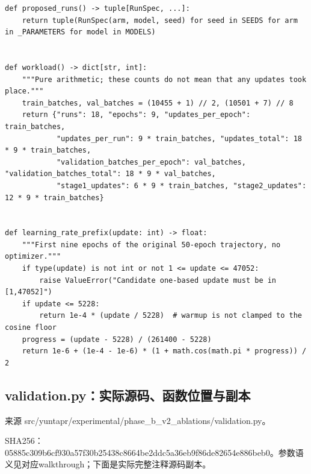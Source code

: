 \documentclass[UTF8,fontset=fandol,10pt]{ctexart}
\begin{document}
\begin{lstlisting}
def proposed_runs() -> tuple[RunSpec, ...]:
    return tuple(RunSpec(arm, model, seed) for seed in SEEDS for arm in _PARAMETERS for model in MODELS)


def workload() -> dict[str, int]:
    """Pure arithmetic; these counts do not mean that any updates took place."""
    train_batches, val_batches = (10455 + 1) // 2, (10501 + 7) // 8
    return {"runs": 18, "epochs": 9, "updates_per_epoch": train_batches,
            "updates_per_run": 9 * train_batches, "updates_total": 18 * 9 * train_batches,
            "validation_batches_per_epoch": val_batches, "validation_batches_total": 18 * 9 * val_batches,
            "stage1_updates": 6 * 9 * train_batches, "stage2_updates": 12 * 9 * train_batches}


def learning_rate_prefix(update: int) -> float:
    """First nine epochs of the original 50-epoch trajectory, no optimizer."""
    if type(update) is not int or not 1 <= update <= 47052:
        raise ValueError("Candidate one-based update must be in [1,47052]")
    if update <= 5228:
        return 1e-4 * (update / 5228)  # warmup is not clamped to the cosine floor
    progress = (update - 5228) / (261400 - 5228)
    return 1e-6 + (1e-4 - 1e-6) * (1 + math.cos(math.pi * progress)) / 2
\end{lstlisting}


\subsection{validation.py：实际源码、函数位置与副本}

来源 src/\allowbreak{}yuntapr/\allowbreak{}experimental/\allowbreak{}phase\_\allowbreak{}b\_\allowbreak{}v2\_\allowbreak{}ablations/\allowbreak{}validation.py。

SHA256：05885c309b6c\allowbreak{}f930a57f30b2\allowbreak{}5438c8664be2\allowbreak{}ddc5a36eb9f8\allowbreak{}6de82654e886\allowbreak{}beb0。参数语义见对应walkthrough；下面是实际完整注释源码副本。
\end{document}
